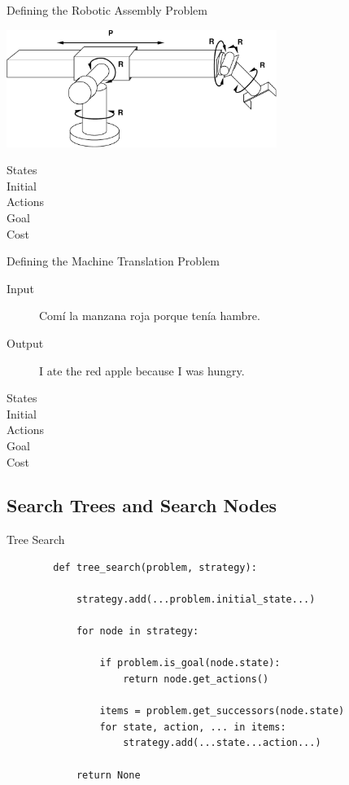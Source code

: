 \documentclass[14pt]{beamer}
\begin{document}
\begin{frame}{Defining the Robotic Assembly Problem}
	\begin{center}
		\includegraphics[height=1.5in]{stanford-arm.pdf}
	\end{center}
	\begin{description}
		\item[States] 
		\item[Initial] 
		\item[Actions] 
		\item[Goal] 
		\item[Cost] 
	\end{description}
\end{frame}

\begin{frame}{Defining the Machine Translation Problem}
	\begin{description}
		\item[Input] Com\'i la manzana roja porque ten\'ia hambre.
		\item[Output] I ate the red apple because I was hungry.
		\bigskip\bigskip
		\item[States]
		\item[Initial]
		\item[Actions]
		\item[Goal]
		\item[Cost]
	\end{description}
\end{frame}

\subsection{Search Trees and Search Nodes}

\begin{frame}[fragile]{Tree Search}
	\footnotesize
	\begin{lstlisting}
		def tree_search(problem, strategy):

		    strategy.add(...problem.initial_state...)

		    for node in strategy:

		        if problem.is_goal(node.state):
		            return node.get_actions()

		        items = problem.get_successors(node.state)
		        for state, action, ... in items:
		            strategy.add(...state...action...)

		    return None
	\end{lstlisting}
\end{frame}
\end{document}
